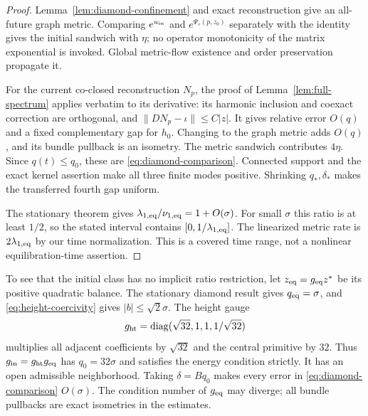 \documentclass[11pt]{amsart}
\theoremstyle{definition}
\theoremstyle{remark}
\newcommand{\diag}{\operatorname{diag}}
\begin{document}
\begin{proof}
Lemma~\ref{lem:diamond-confinement} and exact reconstruction give
an all-future graph metric. Comparing $e^{u_{\rm in}}$ and
$e^{\Psi_\diamond(p,z_0)}$ separately with the identity gives
the initial sandwich with $\eta$; no operator monotonicity of
the matrix exponential is invoked. Global metric-flow existence
and order preservation propagate it.

For the current co-closed reconstruction $N_p$, the proof of
Lemma~\ref{lem:full-spectrum} applies verbatim to its derivative:
its harmonic inclusion and coexact correction are orthogonal,
and $\|DN_p-\iota\|\le C|z|$. It gives relative error $O(q)$
and a fixed complementary gap for $h_0$. Changing to the graph
metric adds $O(q)$, and its bundle pullback is an isometry.
The metric sandwich contributes $4\eta$. Since $q(t)\le q_0$,
these are \eqref{eq:diamond-comparison}. Connected support and
the exact kernel assertion make all three finite modes positive.
Shrinking $q_*,\delta_*$ makes the transferred fourth gap uniform.

The stationary theorem \cite[Corollary 7.1]{WuebbenThreeStep26}
gives $\lambda_{1,\rm eq}/\nu_{1,\rm eq}=1+O(\sigma)$.
For small $\sigma$ this ratio is at least $1/2$, so the stated
interval contains $[0,1/\lambda_{1,\rm eq}]$.
The linearized metric rate is $2\lambda_{1,\rm eq}$ by our time
normalization. This is a covered time range, not a nonlinear
equilibration-time assertion.
\end{proof}

To see that the initial class has no implicit ratio restriction,
let $z_{\rm eq}=g_{\rm eq}z^*$ be its positive quadratic balance.
The stationary diamond result gives $q_{\rm eq}=\sigma$, and
\eqref{eq:height-coercivity} gives $|b|\le\sqrt2\sigma$.
The height gauge
\[
 g_{\rm ht}=\diag(\sqrt{32},1,1,1/\sqrt{32})
\]
multiplies all adjacent coefficients by $\sqrt{32}$ and the
central primitive by $32$. Thus $g_{\rm in}=g_{\rm ht}g_{\rm eq}$
has $q_0=32\sigma$ and satisfies the energy condition strictly.
It has an open admissible neighborhood. Taking $\delta=Bq_0$
makes every error in \eqref{eq:diamond-comparison} $O(\sigma)$.
The condition number of $g_{\rm eq}$ may diverge; all bundle
pullbacks are exact isometries in the estimates.
\end{document}
